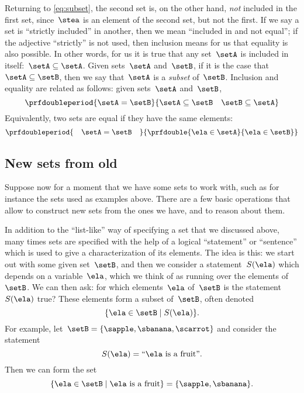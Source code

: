 Returning to \cref{eq:subset}, the second set is, on the other hand, \emph{not} included in the first set, since~$\stea$ is an element of the second set, but not the first.
If we say a set is ``strictly included'' in another, then we mean ``included in and not equal'';
if the adjective ``strictly'' is not used, then inclusion means for us that equality is also possible.
In other words, for us it is true that any set~$\setA$ is included in itself:~$\setA \subseteq \setA$.
Given sets~$\setA$ and~$\setB$, if it is the case that~$\setA \subseteq \setB$, then we say that~$\setA$ is a \emph{subset} of~$\setB$.
Inclusion and equality are related as follows: given sets~$\setA$ and~$\setB$,
%
\begin{equation*}
    \prfdoubleperiod{
        \setA = \setB
    }{
        {\setA \subseteq \setB}
        \quad
        {\setB \subseteq \setA}
    }
\end{equation*}
%
Equivalently, two sets are equal if they have the same elements:
\begin{equation*}
    \prfdoubleperiod{
        \quad \setA = \setB \quad
    }{
        \prfdouble{
            \ela \in \setA
        }{
            \ela \in \setB
        }
    }
\end{equation*}


\subsection{New sets from old}

Suppose now for a moment that we have some sets to work with, such as for instance the sets used as examples above.
There are a few basic operations that allow to construct new sets from the ones we have, and to reason about them.

In addition to the ``list-like'' way of specifying a set that we discussed above, many times sets are specified with the help of a logical ``statement'' or ``sentence'' which is used to give a characterization of its elements.
The idea is this: we start out with some given set~$\setB$, and then we consider a statement~$S(\ela)$ which depends on a variable~$\ela$, which we think of as running over the elements of~$\setB$.
We can then ask: for which elements~$\ela$ of~$\setB$ is the statement~$S(\ela)$ true?
These elements form a subset of~$\setB$, often denoted
%
\begin{equation}
    \label{eq:axiom-specialization}
    \{ \ela \in \setB \mid S(\ela) \}.
\end{equation}
%
For example, let~$\setB = \{ \sapple, \sbanana, \scarrot \}$ and consider the statement
%
\begin{equation*}
    S(\ela) = \text{``} \ela \text{ is a fruit''}.
\end{equation*}
%
Then we can form the set
%
\begin{equation*}
    \{ \ela \in \setB \mid \ela \text{ is a fruit} \} = \{ \sapple, \sbanana \}.
\end{equation*}

